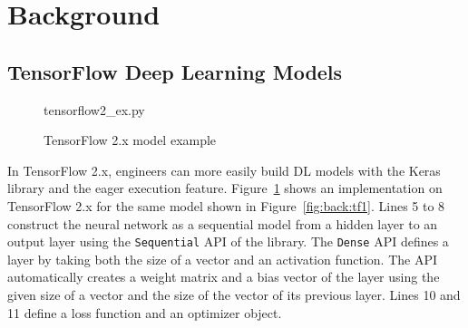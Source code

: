 \section{Background}\label{sec:background}

\subsection{TensorFlow Deep Learning Models}


\begin{figure}[ht!]
  \centering
  
{tensorflow2_ex.py}
  \caption{TensorFlow 2.x model example}
\label{fig:back:tf2}
\end{figure}

In TensorFlow 2.x, engineers can more easily build DL models with the Keras
library and the eager execution feature.
Figure~\ref{fig:back:tf2} shows an implementation on TensorFlow 2.x for the
same model shown in Figure~\ref{fig:back:tf1}.
Lines 5 to 8 construct the neural network as a sequential model from a
hidden layer to an output layer using the {\tt Sequential} API of the
library.
The {\tt Dense} API defines a layer by taking both the size of a vector and an
activation function. 
The API automatically creates a weight matrix and a bias vector of the layer
using the given size of a vector and the size of the vector of its previous
layer.
Lines 10 and 11 define a loss function and an optimizer object.  
